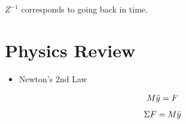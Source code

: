 \begin{itemize}
            $Z^{-1}$ corresponds to going back in time.
    \end{itemize}

\section{Physics Review}

    \begin{itemize}
        \item Newton's 2nd Law

            \begin{align*} M \ddot{y} = F \end{align*}
            \begin{align*} \Sigma F  = M \ddot{y} \end{align*}

    \end{itemize}



